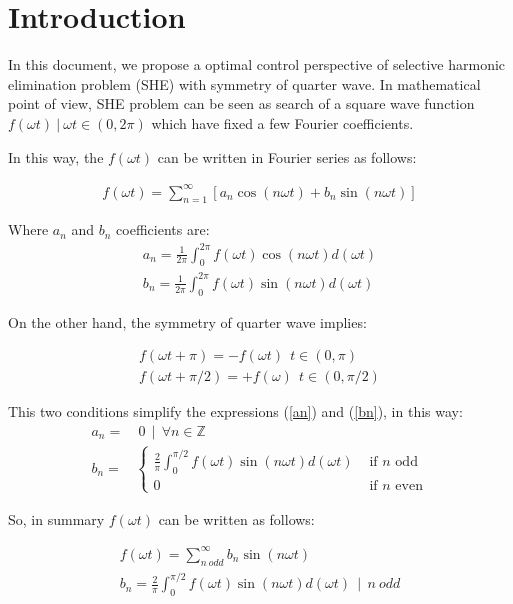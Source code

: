 \section{Introduction}

In this document, we propose  a optimal control  perspective of selective harmonic elimination problem (SHE) with symmetry of quarter wave. 
%
In mathematical point of view, SHE problem can be seen as search of a square wave function  $f(\omega t ) \ | \ \omega t \in (0,2\pi)$ which have fixed a few Fourier coefficients. 
\newline

%
In this way, the $f(\omega t)$ can be written in Fourier series as follows:

\begin{gather}
    f(\omega t ) = \sum_{n=1}^\infty [a_n \cos(n\omega t) + b_n \sin(n \omega t)] 
\end{gather}

Where $a_n$ and $b_n$ coefficients are:
\begin{gather}
    a_n = \frac{1}{2\pi} \int_0^{2\pi} f(\omega t ) \cos(n\omega t)d(\omega t) \label{an}\\
    b_n = \frac{1}{2\pi} \int_0^{2\pi} f(\omega t ) \sin(n\omega t)d(\omega t) \label{bn}    
\end{gather}

On the other hand, the symmetry of quarter wave implies:

\begin{gather}
    f(\omega t + \pi)     = -f(\omega t)  \ \ t \in (0,\pi)\\
    f(\omega t + \pi/2)   = +f(\omega)    \ \ t \in (0,\pi/2)
\end{gather}

This two conditions simplify the expressions (\ref{an}) and (\ref{bn}), in this way:
\begin{align}
    a_n = & \  0 \ \ | \  \ \forall n \in \mathbb{Z}\\
    b_n = & \begin{cases}
        \frac{2}{\pi} \int_0^{\pi/2} f(\omega t ) \sin(n\omega t)d(\omega t) & \text{ if } n \text{ odd} \\
        0 & \text{ if } n \text{ even}
    \end{cases}
\end{align}

So, in summary $f(\omega t )$ can be written as follows:

\begin{gather}
    f(\omega t ) = \sum_{n \ odd}^\infty  b_n \sin(n \omega t) \\
    b_n = \frac{2}{\pi}\int_0^{\pi/2} f(\omega t ) \sin(n\omega t)d(\omega t) \ \ | \ \ n \ odd \label{bn_odd}
\end{gather}


